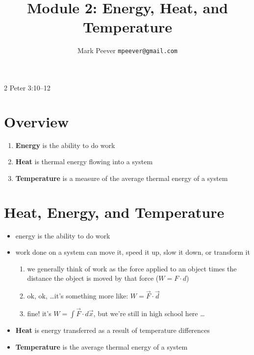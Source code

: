 \documentclass[11pt, oneside]{article}   	%
\title{Module 2: Energy, Heat, and Temperature }
\author{Mark Peever \texttt{mpeever@gmail.com}}
\begin{document}
\maketitle

\begin{center}
2 Peter 3:10--12
\end{center}

\section{Overview}
\begin{enumerate}
\item \textbf{Energy} is the ability to do work
\item \textbf{Heat} is thermal energy flowing into a system
\item \textbf{Temperature} is a measure of the average thermal energy of a system
\end{enumerate}

\section{Heat, Energy, and Temperature}
\begin{itemize}
\item energy is the ability to do work
\item work done on a system can move it, speed it up, slow it down, or transform it
\begin{enumerate}
\item we generally think of work as the force applied to an object times the distance the object is moved by that force ($W = F \cdot d$)
\item ok, ok, \ldots it's something more like: $W = \vec{F} \cdot \vec{d}$
\item fine! it's  $W = \int \vec{F} \cdot d\vec{x}$, but we're still in high school here \ldots
\end{enumerate}
\item \textbf{Heat} is energy transferred as a result of temperature differences
\item \textbf{Temperature} is the average thermal energy of a system
\end{itemize}
\end{document}
